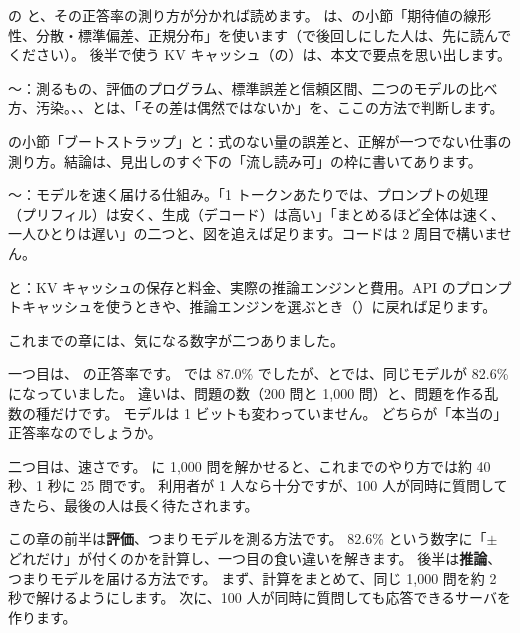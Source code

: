 \begin{readingguide}
\item[\rgpre] の  と、その正答率の測り方が分かれば読めます。
は、の小節「期待値の線形性、分散・標準偏差、正規分布」を使います（で後回しにした人は、先に読んでください）。
後半で使う KV キャッシュ（の）は、本文で要点を思い出します。
\item[\rgmust] 〜：測るもの、評価のプログラム、標準誤差と信頼区間、二つのモデルの比べ方、汚染。、、とは、「その差は偶然ではないか」を、ここの方法で判断します。
\item[\rgskim] の小節「ブートストラップ」と：式のない量の誤差と、正解が一つでない仕事の測り方。結論は、見出しのすぐ下の「流し読み可」の枠に書いてあります。
\item[\rgskim] 〜：モデルを速く届ける仕組み。「1 トークンあたりでは、プロンプトの処理（プリフィル）は安く、生成（デコード）は高い」「まとめるほど全体は速く、一人ひとりは遅い」の二つと、図を追えば足ります。コードは 2 周目で構いません。
\item[\rglater] と：KV キャッシュの保存と料金、実際の推論エンジンと費用。API のプロンプトキャッシュを使うときや、推論エンジンを選ぶとき（）に戻れば足ります。
\end{readingguide}

これまでの章には、気になる数字が二つありました。

一つ目は、 の正答率です。
では 87.0\% でしたが、とでは、同じモデルが 82.6\% になっていました。
違いは、問題の数（200 問と 1,000 問）と、問題を作る乱数の種だけです。
モデルは 1 ビットも変わっていません。
どちらが「本当の」正答率なのでしょうか。

二つ目は、速さです。
 に 1,000 問を解かせると、これまでのやり方では約 40 秒、1 秒に 25 問です。
利用者が 1 人なら十分ですが、100 人が同時に質問してきたら、最後の人は長く待たされます。

この章の前半は\textbf{評価}、つまりモデルを測る方法です。
82.6\% という数字に「$\pm$ どれだけ」が付くのかを計算し、一つ目の食い違いを解きます。
後半は\textbf{推論}、つまりモデルを届ける方法です。
まず、計算をまとめて、同じ 1,000 問を約 2 秒で解けるようにします。
次に、100 人が同時に質問しても応答できるサーバを作ります。

